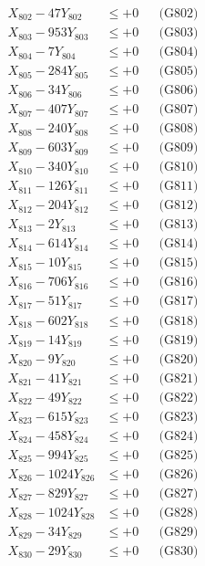 \documentclass[a4paper,10pt]{article}
\begin{document}
{\begin{align}
X_{802} - 47Y_{802} &\leq +0 && \text{(G802)} \\
X_{803} - 953Y_{803} &\leq +0 && \text{(G803)} \\
X_{804} - 7Y_{804} &\leq +0 && \text{(G804)} \\
X_{805} - 284Y_{805} &\leq +0 && \text{(G805)} \\
X_{806} - 34Y_{806} &\leq +0 && \text{(G806)} \\
X_{807} - 407Y_{807} &\leq +0 && \text{(G807)} \\
X_{808} - 240Y_{808} &\leq +0 && \text{(G808)} \\
X_{809} - 603Y_{809} &\leq +0 && \text{(G809)} \\
X_{810} - 340Y_{810} &\leq +0 && \text{(G810)} \\
\allowbreak
X_{811} - 126Y_{811} &\leq +0 && \text{(G811)} \\
X_{812} - 204Y_{812} &\leq +0 && \text{(G812)} \\
X_{813} - 2Y_{813} &\leq +0 && \text{(G813)} \\
X_{814} - 614Y_{814} &\leq +0 && \text{(G814)} \\
X_{815} - 10Y_{815} &\leq +0 && \text{(G815)} \\
X_{816} - 706Y_{816} &\leq +0 && \text{(G816)} \\
X_{817} - 51Y_{817} &\leq +0 && \text{(G817)} \\
X_{818} - 602Y_{818} &\leq +0 && \text{(G818)} \\
X_{819} - 14Y_{819} &\leq +0 && \text{(G819)} \\
X_{820} - 9Y_{820} &\leq +0 && \text{(G820)} \\
\allowbreak
X_{821} - 41Y_{821} &\leq +0 && \text{(G821)} \\
X_{822} - 49Y_{822} &\leq +0 && \text{(G822)} \\
X_{823} - 615Y_{823} &\leq +0 && \text{(G823)} \\
X_{824} - 458Y_{824} &\leq +0 && \text{(G824)} \\
X_{825} - 994Y_{825} &\leq +0 && \text{(G825)} \\
X_{826} - 1024Y_{826} &\leq +0 && \text{(G826)} \\
X_{827} - 829Y_{827} &\leq +0 && \text{(G827)} \\
X_{828} - 1024Y_{828} &\leq +0 && \text{(G828)} \\
X_{829} - 34Y_{829} &\leq +0 && \text{(G829)} \\
X_{830} - 29Y_{830} &\leq +0 && \text{(G830)} \\

\end{align}}
\end{document}
